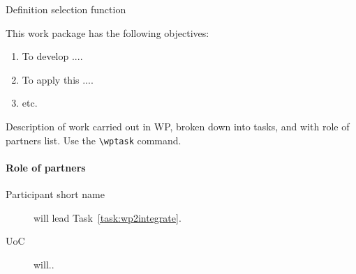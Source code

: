 \begin{workpackage}{Definition selection function}
    \label{wp:selfundefinition}
    
  \makewptable %
    
  \begin{wpobjectives}
    This work package has the following objectives:
    \begin{enumerate}
    \item To develop ....
    \item To apply this ....
    \item etc.
    \end{enumerate}
  \end{wpobjectives}
  
  \begin{wpdescription}
 
    Description of work carried out in WP, broken down into tasks, and
    with role of partners list. Use the \texttt{\textbackslash wptask} command.

    
    \paragraph{Role of partners}
    \begin{description}
    \item[Participant short name] will lead Task~\ref{task:wp2integrate}.
    \item[UoC] will..
    \end{description}
  \end{wpdescription}
  
  \begin{wpdeliverables}


\end{wpdeliverables}
\end{workpackage}
